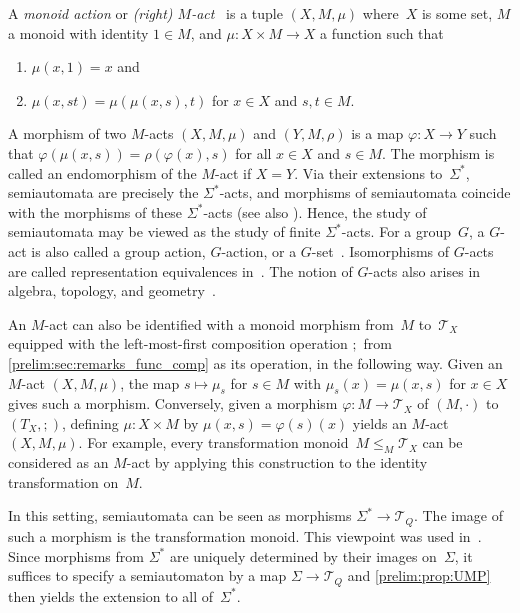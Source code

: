 A \emph{monoid action} or \emph{(right) $M$-act}~\cite{KilpKnauerMikhalev2000_MonoidsActs}
is a tuple $(X, M, \mu)$ where~$X$ is some set, $M$ a monoid with identity $1\in M$,
and $\mu \colon X \times M \to X$
a function such that 
\begin{enumerate}
\item $\mu(x, 1) = x$ and

\item $\mu(x, st) = \mu(\mu(x, s), t)$ for $x \in X$ and $s,t \in M$.
\end{enumerate}
A morphism of two $M$-acts $(X,M,\mu)$ and $(Y, M, \rho)$
is a map $\varphi \colon X \to Y$ such that $\varphi(\mu(x, s)) = \rho(\varphi(x),s)$
for all $x \in X$ and $s \in M$.
The morphism is called an endomorphism of the $M$-act
if $X = Y$. Via their extensions to~$\Sigma^*$, semiautomata are precisely the $\Sigma^*$-acts, and morphisms of semiautomata
coincide with the morphisms of these $\Sigma^*$-acts (see also \cite[Prop.~4.5]{KilpKnauerMikhalev2000_MonoidsActs}).
Hence, the study of semiautomata may be viewed as the study of finite $\Sigma^*$-acts.
For a group~$G$, a $G$-act
is also called a group action, $G$-action, or a $G$-set~\cite{cameron_1999,dixon1996permutation}.
Isomorphisms of $G$-acts are called representation equivalences
in~\cite[p.~21]{dixon1996permutation}.
The notion of $G$-acts also arises in algebra, topology,
and geometry~\cite{NeumannStoyThompson1994GroupsAndGeometry}.

\begin{remark}
	An $M$-act can also be identified with a monoid morphism from~$M$ to~$\mathcal T_X$
	equipped with the left-most-first composition operation $;$ from \cref{prelim:sec:remarks_func_comp}
	as its operation, in the following way.
	Given an $M$-act $(X, M, \mu)$, the map $s \mapsto \mu_s$ for $s \in M$
	with $\mu_s(x) = \mu(x, s)$ for $x \in X$ gives such a morphism.
	Conversely, given a morphism $\varphi \colon M \to \mathcal T_X$ of $(M,\cdot)$ to $(T_X, ;)$,
	defining $\mu \colon X \times M$ by $\mu(x, s) = \varphi(s)(x)$
	yields an $M$-act $(X, M, \mu)$.
	For example, every transformation monoid~$M \le_M \mathcal T_X$
	can be considered as an $M$-act by applying
	this construction to the identity transformation on~$M$.	
	
	In this setting, semiautomata can be seen as morphisms $\Sigma^* \to \mathcal T_Q$.
	The image of such a morphism is the transformation monoid.
	This viewpoint was used in~\cite{Rystsov97}.
	Since morphisms from $\Sigma^*$ are uniquely determined
	by their images on~$\Sigma$, it suffices to specify
	a semiautomaton by a map $\Sigma \to \mathcal T_Q$ and
	\cref{prelim:prop:UMP} then yields the extension to all of~$\Sigma^*$.
\end{remark}

